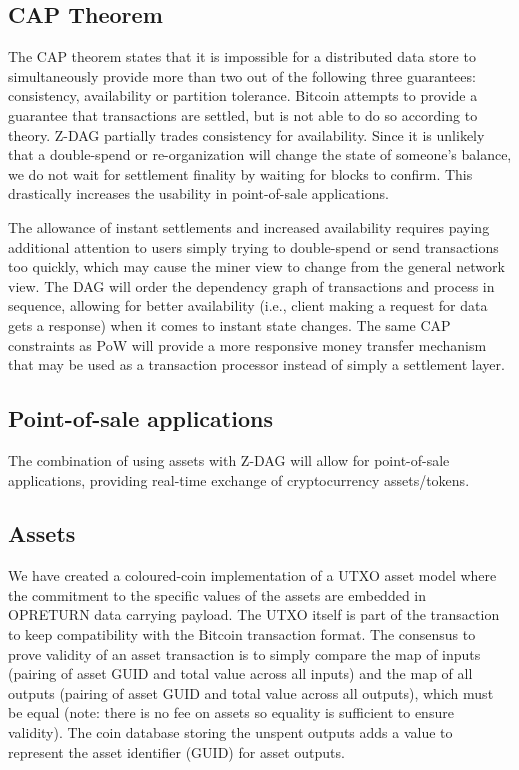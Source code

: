 \documentclass[peerreview]{ieeesyscoin}
\begin{document}
\subsection{CAP Theorem}
The CAP theorem \cite{Bre12} states that it is impossible for a distributed data store to simultaneously provide more than two out of the following three guarantees: consistency, availability or partition tolerance. Bitcoin attempts to provide a guarantee that transactions are settled, but is not able to do so according to theory. Z-DAG partially trades consistency for availability. Since it is unlikely that a double-spend or re-organization will change the state of someone’s balance, we do not wait for settlement finality by waiting for blocks to confirm. This drastically increases the usability in point-of-sale applications.

The allowance of instant settlements and increased availability requires paying additional attention to users simply trying to double-spend or send transactions too quickly, which may cause the miner view to change from the general network view. The DAG will order the dependency graph of transactions and process in sequence, allowing for better availability (i.e., client making a request for data gets a response) when it comes to instant state changes. The same CAP constraints as PoW will provide a more responsive money transfer mechanism that may be used as a transaction processor instead of simply a settlement layer.

\subsection{Point-of-sale applications}
The combination of using assets with Z-DAG will allow for point-of-sale applications, providing real-time exchange of cryptocurrency assets/tokens.

\subsection{Assets}
We have created a coloured-coin implementation of a UTXO asset model where the commitment to the specific values of the assets are embedded in OPRETURN data carrying payload. The UTXO itself is part of the transaction to keep compatibility with the Bitcoin transaction format. The consensus to prove validity of an asset transaction is to simply compare the map of inputs (pairing of asset GUID and total value across all inputs) and the map of all outputs (pairing of asset GUID and total value across all outputs), which must be equal (note: there is no fee on assets so equality is sufficient to ensure validity). The coin database storing the unspent outputs adds a value to represent the asset identifier (GUID) for asset outputs.
\end{document}
